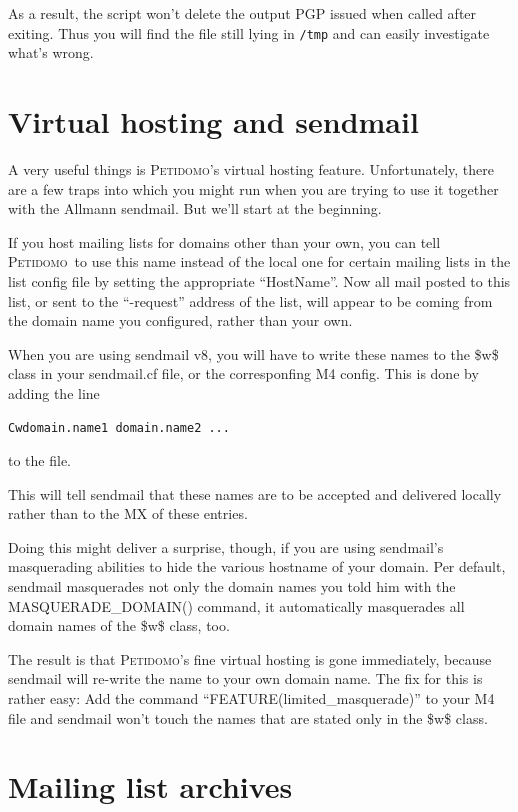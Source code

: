 \documentclass[a4paper]{report}
\newcommand{\Petidomo}{{\scshape Peti\-domo}}
\newcommand{\file}[1]{{\tt #1}}
\begin{document}
As a result, the script won't delete the output PGP issued when called
after exiting. Thus you will find the file still lying in \file{/tmp}
and can easily investigate what's wrong.

\section{Virtual hosting and sendmail}
\label{virtual hosting and sendmail}

A very useful things is \Petidomo's virtual hosting feature.
Unfortunately, there are a few traps into which you might run when you
are trying to use it together with the Allmann sendmail. But we'll
start at the beginning.

If you host mailing lists for domains other than your own, you can
tell \Petidomo\ to use this name instead of the local one for certain
mailing lists in the list config file by setting the appropriate
``HostName''. Now all mail posted to this list, or sent to the
``-request'' address of the list, will appear to be coming from the
domain name you configured, rather than your own.

When you are using sendmail v8, you will have to write these names to
the \$w\$ class in your sendmail.cf file, or the corresponfing M4
config. This is done by adding the line
\begin{verbatim}
Cwdomain.name1 domain.name2 ...
\end{verbatim}
to the file.

This will tell sendmail that these names are to be accepted and
delivered locally rather than to the MX of these entries.

Doing this might deliver a surprise, though, if you are using
sendmail's masquerading abilities to hide the various hostname of your
domain. Per default, sendmail masquerades not only the domain names
you told him with the MASQUERADE\_DOMAIN() command, it automatically
masquerades all domain names of the \$w\$ class, too.

The result is that \Petidomo's fine virtual hosting is gone
immediately, because sendmail will re-write the name to your own
domain name. The fix for this is rather easy: Add the command
``FEATURE(limited\_masquerade)'' to your M4 file and sendmail won't
touch the names that are stated only in the \$w\$ class.

\section{Mailing list archives}
\label{mailing list archives}
\end{document}
